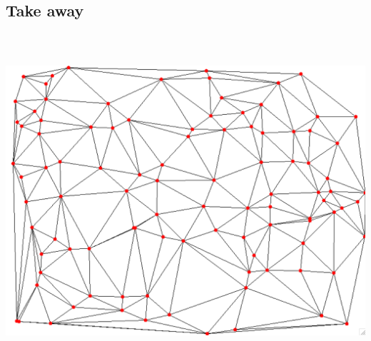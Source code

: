 \documentclass{beamer}
\begin{document}
	\subsection*{Take away}
	\begin{frame}
		\frametitle{~}
		\begin{center}
			\includegraphics[scale=0.3]{convexhull-good.png}
		\end{center}
	\end{frame}
\end{document}
